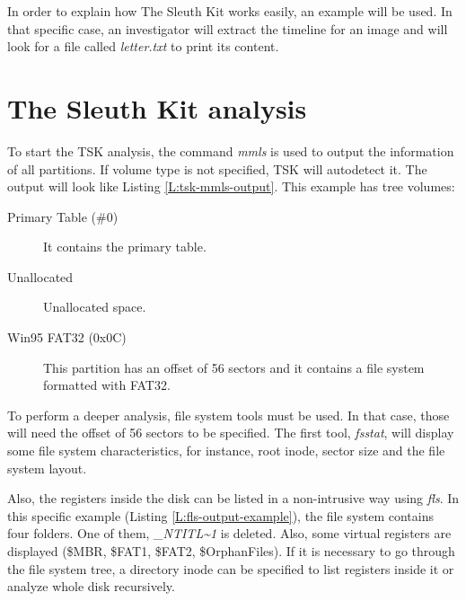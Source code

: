 In order to explain how The Sleuth Kit works easily, an example will be used.
In that specific case, an investigator will extract the timeline for an image
and will look for a file called \textit{letter.txt} to print its content.

\section{The Sleuth Kit analysis}
\label{S:tsk-analysis}

To start the TSK analysis, the command \textit{mmls} is used to output the 
information of all partitions. If volume type is not specified, TSK will
autodetect it. The output will look like Listing \ref{L:tsk-mmls-output}.
This example has tree volumes:

\begin{description}
	\item [Primary Table (\#0)]
	It contains the primary table. 
	
	\item [Unallocated]
	Unallocated space.

	\item [Win95 FAT32 (0x0C)]
	This partition has an offset of 56 sectors and it contains a file system formatted with FAT32.
	
\end{description}


To perform a deeper analysis, file system tools must be used. In that case,
those will need the offset of 56 sectors to be specified. The  first tool,
\textit{fsstat}, will display some file system characteristics, for instance,
root inode, sector size and the file system layout.

Also, the registers inside the disk can be listed in a non-intrusive way using 
\textit{fls}. In this specific example (Listing \ref{L:fls-output-example}),
the file system contains four folders. One of them,  
\textit{\_NTITL\textasciitilde1} is deleted. Also, some virtual registers are
displayed (\$MBR, \$FAT1, \$FAT2, \$OrphanFiles). If it is necessary to go
through the file system tree, a directory inode can be specified to list
registers inside it or analyze whole disk recursively.

